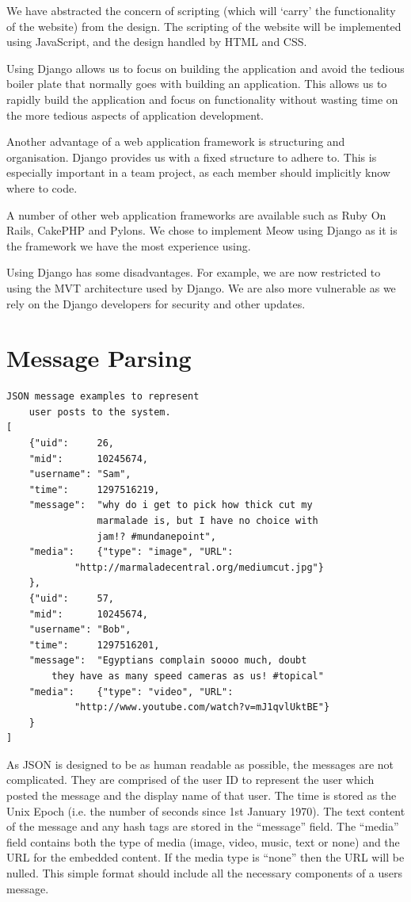 \documentclass{sig-alt-release2}
\begin{document}
We have abstracted the concern of scripting (which will `carry' the functionality of the website) from the design. The scripting of the website will be implemented using JavaScript, and the design handled by HTML and CSS.

Using Django allows us to focus on building the application and avoid the tedious boiler plate that normally goes with building an application. This allows us to rapidly build the application and focus on functionality without wasting time on the more tedious aspects of application development.

Another advantage of a web application framework is structuring and organisation. Django provides us with a fixed structure to adhere to. This is especially important in a team project, as each member should implicitly know where to code.

A number of other web application frameworks are available such as Ruby On Rails, CakePHP and Pylons. We chose to implement Meow using Django as it is the framework we have the most experience using.

Using Django has some disadvantages.  For example, we are now restricted to using the MVT architecture used by Django. We are also more vulnerable as we rely on the Django developers for security and other updates. 

\section{Message Parsing}



\begin{verbatim}
JSON message examples to represent 
	user posts to the system.
[
	{"uid":  	26,
	"mid":  	10245674,
    "username": "Sam",
    "time": 	1297516219,
    "message":  "why do i get to pick how thick cut my 
				marmalade is, but I have no choice with
				jam!? #mundanepoint",
	"media":	{"type": "image", "URL":
			"http://marmaladecentral.org/mediumcut.jpg"}
	},
	{"uid":  	57,
	"mid":  	10245674,
    "username": "Bob",
    "time": 	1297516201,
    "message":  "Egyptians complain soooo much, doubt
		they have as many speed cameras as us! #topical"
	"media":	{"type": "video", "URL":
			"http://www.youtube.com/watch?v=mJ1qvlUktBE"}
	}
]  
\end{verbatim}

As JSON is designed to be as human readable as possible, the messages are not complicated. They are comprised of the user ID to represent the user which posted the message and the display name of that user. The time is stored as the Unix Epoch (i.e. the number of seconds since 1st January 1970). The text content of the message and any hash tags are stored in the ``message'' field. The ``media'' field contains both the type of media (image, video, music, text or none) and the URL for the embedded content. If the media type is ``none'' then the URL will be nulled. This simple format should include all the necessary components of a users message.
\end{document}
